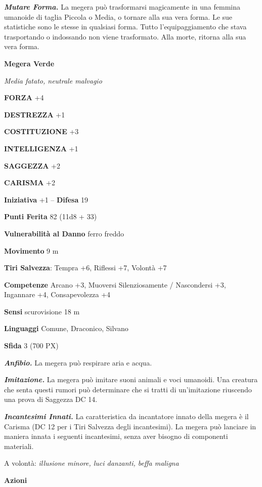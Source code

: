 \begin{multicols}{2}
	\textit{\textbf{Mutare Forma.}} La megera può trasformarsi magicamente in una femmina umanoide di taglia Piccola o Media, o tornare alla sua vera forma. Le sue statistiche sono le stesse in qualsiasi forma. Tutto l'equipaggiamento che stava trasportando o indossando non viene trasformato. Alla morte, ritorna alla sua vera forma.



	\medskip{}\textbf{Megera Verde}

	\textit{Media fatato, neutrale malvagio}

	\textbf{FORZA} +4

	\textbf{DESTREZZA} +1

	\textbf{COSTITUZIONE} +3

	\textbf{INTELLIGENZA} +1

	\textbf{SAGGEZZA} +2

	\textbf{CARISMA} +2

	\textbf{Iniziativa} +1 -- \textbf{Difesa} 19

	\textbf{Punti Ferita} 82 (11d8 + 33)

	\textbf{Vulnerabilità al Danno} ferro freddo

	\textbf{Movimento} 9 m

	\textbf{Tiri Salvezza}: Tempra +6, Riflessi +7, Volontà +7

	\textbf{Competenze} Arcano +3, Muoversi Silenziosamente / Nascondersi +3, Ingannare +4, Consapevolezza +4

	\textbf{Sensi} scurovisione 18 m

	\textbf{Linguaggi} Comune, Draconico, Silvano

	\textbf{Sfida} 3 (700 PX)

	\textit{\textbf{Anfibio.}} La megera può respirare aria e acqua.

	\textit{\textbf{Imitazione.}} La megera può imitare suoni animali e voci umanoidi. Una creatura che senta questi rumori può determinare che si tratti di un'imitazione riuscendo una prova di Saggezza DC 14.

	\textit{\textbf{Incantesimi Innati.}} La caratteristica da incantatore innato della megera è il Carisma (DC 12 per i Tiri Salvezza degli incantesimi). La megera può lanciare in maniera innata i seguenti incantesimi, senza aver bisogno di componenti materiali.

	A volontà: \textit{illusione minore, luci danzanti, beffa maligna}

	\textbf{Azioni}


\end{multicols}

